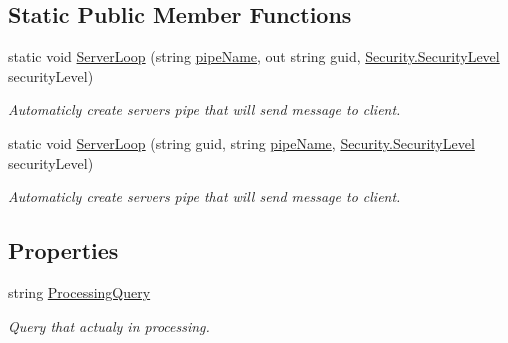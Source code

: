 \subsection*{Static Public Member Functions}
\begin{DoxyCompactItemize}
\item 
static void \mbox{\hyperlink{class_pipes_provider_1_1_server_1_1_transmission_controllers_1_1_server_to_client_transmission_controller_a1315fe8071f9e83fdaae7d248cf822e2}{Server\+Loop}} (string \mbox{\hyperlink{class_pipes_provider_1_1_server_1_1_transmission_controllers_1_1_base_server_transmission_controller_a4ce9911f1ad6814d3e5c9096d9ddde57}{pipe\+Name}}, out string guid, \mbox{\hyperlink{namespace_pipes_provider_1_1_security_a1a6020eca1c661a6f7140e8260502d7e}{Security.\+Security\+Level}} security\+Level)
\begin{DoxyCompactList}\small\item\em Automaticly create server\textquotesingle{}s pipe that will send message to client. \end{DoxyCompactList}\item 
static void \mbox{\hyperlink{class_pipes_provider_1_1_server_1_1_transmission_controllers_1_1_server_to_client_transmission_controller_a0b40f93950cbf37335373f6efec0a4f1}{Server\+Loop}} (string guid, string \mbox{\hyperlink{class_pipes_provider_1_1_server_1_1_transmission_controllers_1_1_base_server_transmission_controller_a4ce9911f1ad6814d3e5c9096d9ddde57}{pipe\+Name}}, \mbox{\hyperlink{namespace_pipes_provider_1_1_security_a1a6020eca1c661a6f7140e8260502d7e}{Security.\+Security\+Level}} security\+Level)
\begin{DoxyCompactList}\small\item\em Automaticly create server\textquotesingle{}s pipe that will send message to client. \end{DoxyCompactList}\end{DoxyCompactItemize}
\subsection*{Properties}
\begin{DoxyCompactItemize}
\item 
string \mbox{\hyperlink{class_pipes_provider_1_1_server_1_1_transmission_controllers_1_1_server_to_client_transmission_controller_abc1b9e3483f9e0f1fd83e72d9b87377d}{Processing\+Query}}
\begin{DoxyCompactList}\small\item\em Query that actualy in processing. \end{DoxyCompactList}\end{DoxyCompactItemize}
